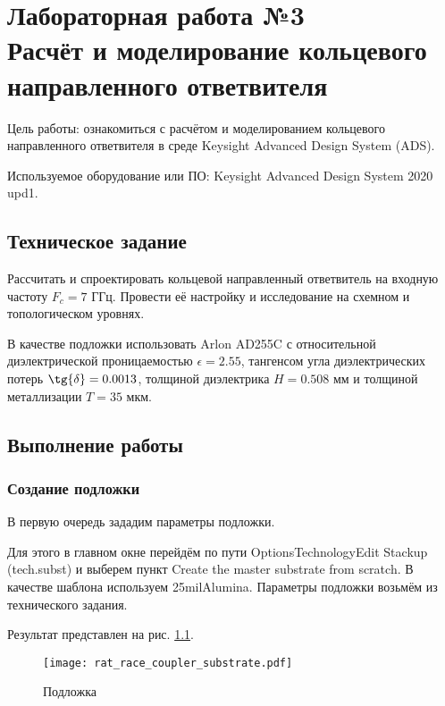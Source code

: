 \chapter{Лабораторная работа №3 \\
Расчёт и моделирование кольцевого направленного ответвителя}

Цель работы: ознакомиться с расчётом и моделированием кольцевого направленного ответвителя в среде Keysight Advanced Design System (ADS).

Используемое оборудование или ПО: Keysight Advanced Design System 2020 upd1.

\section{Техническое задание}

Рассчитать и спроектировать кольцевой направленный ответвитель на входную частоту $F_c = 7 \text{~ГГц}$.
Провести её настройку и исследование на схемном и топологическом уровнях.

В качестве подложки использовать Arlon AD255C с относительной диэлектрической проницаемостью $\epsilon = 2.55$, тангенсом угла диэлектрических потерь $\tg{\delta} = 0.0013$, толщиной диэлектрика $H = 0.508 \text{~мм}$ и толщиной металлизации $T = 35 \text{~мкм}$.

\section{Выполнение работы}

\subsection{Создание подложки}

В первую очередь зададим параметры подложки.

Для этого в главном окне перейдём по пути Options\textrightarrow Technology\textrightarrow Edit Stackup (tech.subst) и выберем пункт Create the master substrate from scratch.
В качестве шаблона используем 25milAlumina.
Параметры подложки возьмём из технического задания.

Результат представлен на рис. \ref{fig:rat_race_coupler_substrate}.

\begin{figure}
    \centering
    \texttt{[image: rat\_race\_coupler\_substrate.pdf]}
    \caption{Подложка}
    \label{fig:rat_race_coupler_substrate}
\end{figure}

